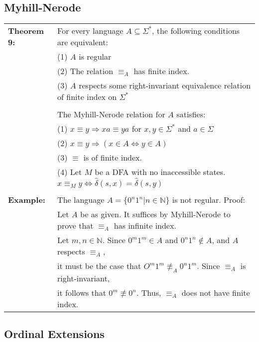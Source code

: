 \documentclass[11pt]{article}
\begin{document}
\subsection{Myhill-Nerode}
\begin{tabular}{ll}
{\bf Theorem 9:} & For every language $A \subseteq \Sigma^*$, the following conditions are equivalent:\\
& (1) $A$ is regular \\
& (2) The relation $\equiv_A$ has finite index. \\
& (3) $A$ respects some right-invariant equivalence relation of finite index on $\Sigma^*$ \\
\\
& The Myhill-Nerode relation for $A$ satisfies:\\
& (1) $x\equiv y\Rightarrow xa \equiv ya$ for $x,y\in\Sigma^*$ and $a\in\Sigma$ \\ 
& (2) $x\equiv y \Rightarrow (x\in A \Leftrightarrow y \in A)$ \\ 
& (3) $\equiv$ is of finite index. \\
& (4) Let $M$ be a DFA with no inaccessible states. $x \equiv_M y \Leftrightarrow \hat{\delta}(s,x)=\hat{\delta}(s,y)$\\
\\
{\bf Example:} & The language $A = \{0^n1^n|n\in\mathbb{N}\}$ is not regular. Proof: \\
& Let $A$ be as given. It suffices by Myhill-Nerode to prove that $\equiv_A$ has infinite index. \\
& Let $m,n\in\mathbb{N}$. Since $0^m1^m\in A$ and $0^n1^n \not\in A$, and $A$ respects $\equiv_A$, \\
& it must be the case that $O^m1^m\not\equiv_A 0^n1^m$. Since $\equiv_A$ is right-invariant, \\
& it follows that $0^m\not\equiv 0^n$. Thus, $\equiv_A$ does not have finite index.\\
\end{tabular}

\subsection{Ordinal Extensions}
\end{document}
